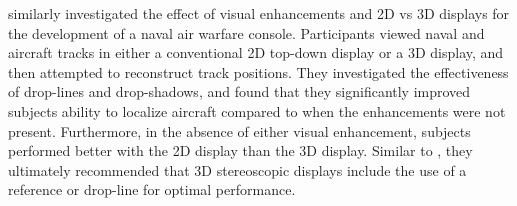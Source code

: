 \citeauthor{smallman_track_2000} similarly investigated the effect of visual enhancements and 2D vs 3D displays for the development of a naval air warfare console.
Participants viewed naval and aircraft tracks in either a conventional 2D top-down display or a 3D display, and then attempted to reconstruct track positions.
They investigated the effectiveness of drop-lines and drop-shadows, and found that they significantly improved subjects ability to localize aircraft compared to when the enhancements were not present.
Furthermore, in the absence of either visual enhancement, subjects performed better with the 2D display than the 3D display.
Similar to \citeauthor{kim_quantitative_1987}, they ultimately recommended that 3D stereoscopic displays include the use of a reference or drop-line for optimal performance.



